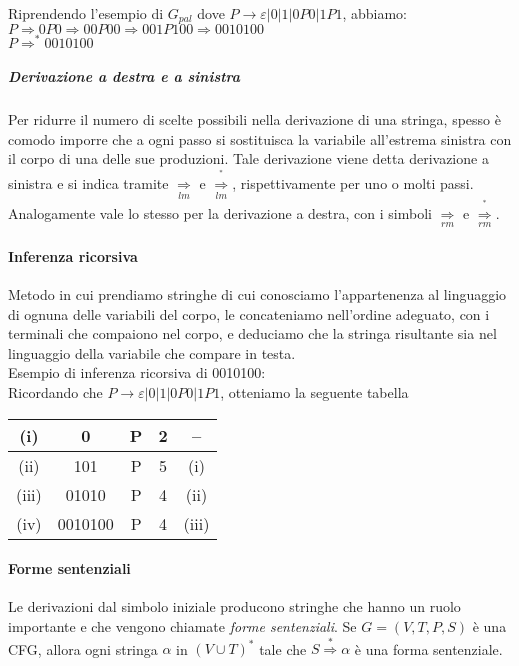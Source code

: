 Riprendendo l'esempio di $G_{pal}$ dove $P\rightarrow\varepsilon|0|1|0P0|1P1$, 
abbiamo:
\\[0.3cm]
$P\Rightarrow 0P0\Rightarrow 00P00 \Rightarrow 001P100 \Rightarrow 0010100$
\\[0.3cm]
$P\Rightarrow ^{\ast} 0010100$

\subparagraph{Derivazione a destra e a sinistra}
Per ridurre il numero di scelte possibili nella derivazione di una stringa, spesso
è comodo imporre che a ogni passo si sostituisca la variabile all'estrema sinistra 
con il corpo di una delle sue produzioni. Tale derivazione viene detta derivazione a 
sinistra e si indica tramite $\underset{lm}{\Rightarrow}$ e 
$\overset{^{\ast}}{\underset{lm}{\Rightarrow}}$, rispettivamente per uno o molti 
passi. Analogamente vale lo stesso per la derivazione a destra, con i simboli
$\underset{rm}{\Rightarrow}$ e 
$\overset{^{\ast}}{\underset{rm}{\Rightarrow}}$.

\paragraph{Inferenza ricorsiva}
Metodo in cui prendiamo stringhe di cui conosciamo l'appartenenza al linguaggio di 
ognuna delle variabili del corpo, le concateniamo nell'ordine adeguato, con i 
terminali che compaiono nel corpo, e deduciamo che la stringa risultante sia nel
linguaggio della variabile che compare in testa.
\\[0.2cm]
Esempio di inferenza ricorsiva di 0010100:
\\[0.1cm]
Ricordando che $P\rightarrow\varepsilon|0|1|0P0|1P1$, otteniamo la seguente tabella

\begin{center}
\begin{tabular}{|c|c|c|c|c|}
\hline 
(i) & 0 & P & 2 & -- \\
\hline
(ii) & 101 & P & 5 & (i) \\
\hline 
(iii) & 01010 & P & 4 & (ii) \\
\hline
(iv) & 0010100 & P & 4 & (iii) \\
\hline
\end{tabular}
\end{center}

\paragraph{Forme sentenziali} Le derivazioni dal simbolo iniziale producono stringhe
che hanno un ruolo importante e che vengono chiamate \textit{forme sentenziali}.
Se $G=(V, T, P, S)$ è una CFG, allora ogni stringa $\alpha$ in $(V\cup T)^{\ast}$
tale che $S\stackrel{\ast}\Rightarrow \alpha$ è una forma sentenziale.

